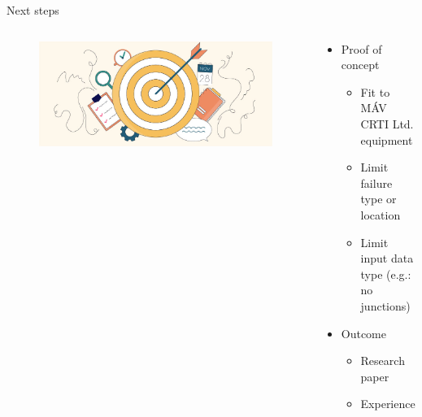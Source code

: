 \documentclass[aspectratio=169]{beamer}
\begin{document}
\begin{frame}{Next steps}
    \begin{columns}
        \begin{column}{0.3\textwidth}
            \begin{figure}[H]
                \centering
                \includegraphics[width=\textwidth]{./tex_images/goal_setting.jpg}
            \end{figure}
        \end{column}
        \pause
        \begin{column}{0.65\textwidth}
            \begin{itemize}
                \item Proof of concept
                      \begin{itemize}
                          \item Fit to MÁV CRTI Ltd. equipment
                          \item Limit failure type or location
                          \item Limit input data type (e.g.: no junctions)
                      \end{itemize}
                \item Outcome
                      \begin{itemize}
                          \item Research paper
                          \item Experience
                      \end{itemize}
            \end{itemize}
        \end{column}
    \end{columns}
\end{frame}
\end{document}
